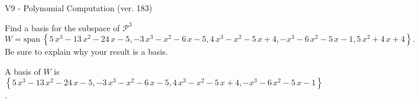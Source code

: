 \begin{exercise}
  \begin{exerciseTitle}V9 - Polynomial Computation (ver. 183)\end{exerciseTitle}
  \begin{exerciseStatement}
    Find a basis for the subspace of \(\mathcal{P}^3\) 
\[W=\mathrm{span}\ \left\{5 \, x^{3} - 13 \, x^{2} - 24 \, x - 5 , -3 \, x^{3} - x^{2} - 6 \, x - 5 , 4 \, x^{3} - x^{2} - 5 \, x + 4 , -x^{3} - 6 \, x^{2} - 5 \, x - 1 , 5 \, x^{2} + 4 \, x + 4\right\}.\]
 Be sure to explain why your result is a basis.


  \end{exerciseStatement}
  \begin{exerciseAnswer}
   A basis of \(W\) is  \(\left\{5 \, x^{3} - 13 \, x^{2} - 24 \, x - 5 , -3 \, x^{3} - x^{2} - 6 \, x - 5 , 4 \, x^{3} - x^{2} - 5 \, x + 4 , -x^{3} - 6 \, x^{2} - 5 \, x - 1\right\}\).
  


  \end{exerciseAnswer}
\end{exercise}